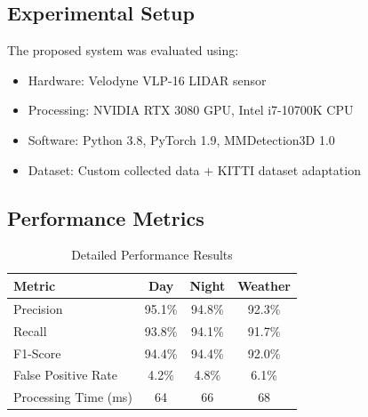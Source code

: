 \documentclass[conference]{IEEEtran}
\begin{document}
\subsection{Experimental Setup}
The proposed system was evaluated using:
\begin{itemize}
\item Hardware: Velodyne VLP-16 LIDAR sensor
\item Processing: NVIDIA RTX 3080 GPU, Intel i7-10700K CPU
\item Software: Python 3.8, PyTorch 1.9, MMDetection3D 1.0
\item Dataset: Custom collected data + KITTI dataset adaptation
\end{itemize}

\subsection{Performance Metrics}
\begin{table}[htbp]
\centering
\caption{Detailed Performance Results}
\label{tab:results}
\begin{tabular}{|l|c|c|c|}
\hline
\textbf{Metric} & \textbf{Day} & \textbf{Night} & \textbf{Weather} \\
\hline
Precision & 95.1\% & 94.8\% & 92.3\% \\
Recall & 93.8\% & 94.1\% & 91.7\% \\
F1-Score & 94.4\% & 94.4\% & 92.0\% \\
False Positive Rate & 4.2\% & 4.8\% & 6.1\% \\
Processing Time (ms) & 64 & 66 & 68 \\
\hline
\end{tabular}
\end{table}
\end{document}
